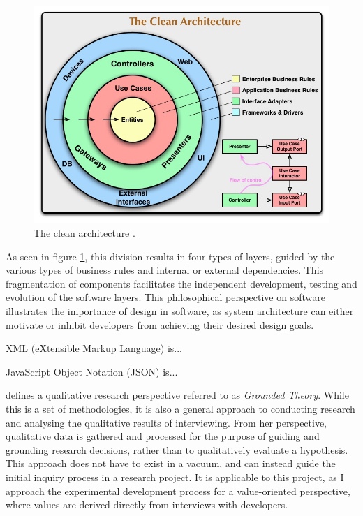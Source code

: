 \documentclass[../report.tex]{subfiles}
\begin{document}
\begin{figure}[H]
\centering
\includegraphics[width=0.9\linewidth]{figures/cleanarchitecture.jpg}
\caption{The clean architecture \cite[p. 196]{martin2018clean}.}
\label{fig:cleanarchitecture}
\end{figure}

As seen in figure \ref{fig:cleanarchitecture}, this division results in four types of layers, guided by the various types of business rules and internal or external dependencies. This fragmentation of components facilitates the independent development, testing and evolution of the software layers. This philosophical perspective on software illustrates the importance of design in software, as system architecture can either motivate or inhibit developers from achieving their desired design goals. \\


\color{red}

XML (eXtensible Markup Language) is...

JavaScript Object Notation (JSON) is... \\

\color{black}


\cite{charmaz2006constructing} defines a qualitative research perspective referred to as \textit{Grounded Theory}. While this is a set of methodologies, it is also a general approach to conducting research and analysing the qualitative results of interviewing. From her perspective, qualitative data is gathered and processed for the purpose of guiding and grounding research decisions, rather than to qualitatively evaluate a hypothesis. This approach does not have to exist in a vacuum, and can instead guide the initial inquiry process in a research project. It is applicable to this project, as I approach the experimental development process for a value-oriented perspective, where values are derived directly from interviews with developers.
\end{document}
